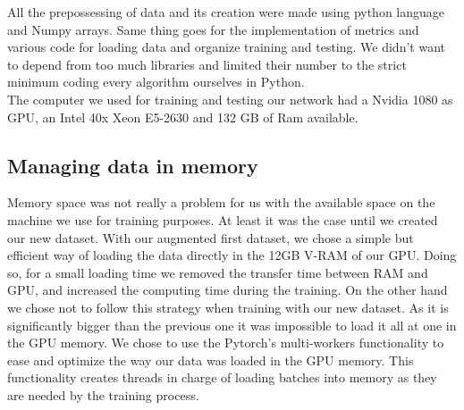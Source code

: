 All the prepossessing of data and its creation were made using python language and Numpy arrays. Same thing goes for the implementation of metrics and various code for loading data and organize training and testing. We didn't want to depend from too much libraries and limited their number to the strict minimum coding every algorithm ourselves in Python.\\

The computer we used for training and testing our network had a Nvidia 1080 as GPU, an Intel 40x Xeon E5-2630 and 132 GB of Ram available.

\subsection{Managing data in memory}
Memory space was not really a problem for us with the available space on the machine we use for training purposes. At least it was the case until we created our new dataset. With our augmented first dataset, we chose a simple but efficient way of loading the data directly in the 12GB V-RAM of our GPU. Doing so, for a small loading time we removed the transfer time between RAM and GPU, and increased the computing time during the training.
On the other hand we chose not to follow this strategy when training with our new dataset. As it is significantly bigger than the previous one it was impossible to load it all at one in the GPU memory. We chose to use the Pytorch's multi-workers functionality to ease and optimize the way our data was loaded in the GPU memory. This functionality creates threads in charge of loading batches into memory as they are needed by the training process.



